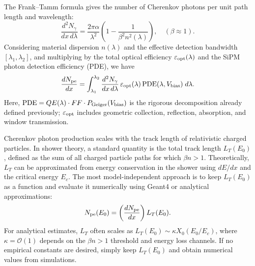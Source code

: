 \documentclass{aastex701}
\begin{document}
The Frank--Tamm formula gives the number of Cherenkov photons per unit path length and wavelength:
\begin{equation}
\frac{d^2N_\gamma}{dx\,d\lambda} 
= \frac{2 \pi \alpha}{\lambda^2} \left( 1 - \frac{1}{\beta^2 n^2(\lambda)} \right), 
\quad (\beta \approx 1).
\end{equation}
Considering material dispersion $n(\lambda)$ and the effective detection bandwidth $[\lambda_1, \lambda_2]$, and multiplying by the total optical efficiency $\varepsilon_{\rm opt}(\lambda)$ and the SiPM photon detection efficiency (PDE), we have
\begin{equation}
\frac{dN_{\rm pe}}{dx} 
= \int_{\lambda_1}^{\lambda_2} 
\frac{d^2N_\gamma}{dx\,d\lambda} \,
\varepsilon_{\rm opt}(\lambda) \,
{\rm PDE}(\lambda, V_{\rm bias}) \; d\lambda.
\end{equation}
Here, ${\rm PDE} = QE(\lambda)\cdot FF \cdot P_{\rm Geiger}(V_{\rm bias})$ is the rigorous decomposition already defined previously; $\varepsilon_{\rm opt}$ includes geometric collection, reflection, absorption, and window transmission.

Cherenkov photon production scales with the track length of relativistic charged particles. In shower theory, a standard quantity is the total track length $L_T(E_0)$, defined as the sum of all charged particle paths for which $\beta n>1$. Theoretically, $L_T$ can be approximated from energy conservation in the shower using $dE/dx$ and the critical energy $E_c$. The most model-independent approach is to keep $L_T(E_0)$ as a function and evaluate it numerically using Geant4 or analytical approximations:
\begin{equation}
N_{\rm pe}(E_0) = \left(\frac{dN_{\rm pe}}{dx}\right) L_T(E_0).
\end{equation}
For analytical estimates, $L_T$ often scales as $L_T(E_0) \sim \kappa X_0 (E_0/E_c)$, where $\kappa = \mathcal{O}(1)$ depends on the $\beta n>1$ threshold and energy loss channels. If no empirical constants are desired, simply keep $L_T(E_0)$ and obtain numerical values from simulations.
\end{document}
